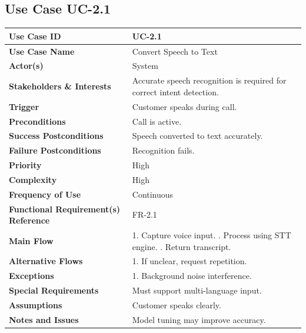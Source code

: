 \documentclass[12pt,a4paper]{report}
\begin{document}
\subsection*{Use Case UC-2.1}
\begin{longtable}{|p{4cm}|p{9cm}|}
\hline
\textbf{Use Case ID} & UC-2.1 \\ \hline
\textbf{Use Case Name} & Convert Speech to Text \\ \hline
\textbf{Actor(s)} & System \\ \hline
\textbf{Stakeholders \& Interests} & Accurate speech recognition is required for correct intent detection. \\ \hline
\textbf{Trigger} & Customer speaks during call. \\ \hline
\textbf{Preconditions} & Call is active. \\ \hline
\textbf{Success Postconditions} & Speech converted to text accurately. \\ \hline
\textbf{Failure Postconditions} & Recognition fails. \\ \hline
\textbf{Priority} & High \\ \hline
\textbf{Complexity} & High \\ \hline
\textbf{Frequency of Use} & Continuous \\ \hline
\textbf{Functional Requirement(s) Reference} & FR-2.1 \\ \hline
\textbf{Main Flow} &
1. Capture voice input. \newline
2. Process using STT engine. \newline
3. Return transcript. \\ \hline
\textbf{Alternative Flows} &
1. If unclear, request repetition. \\ \hline
\textbf{Exceptions} &
1. Background noise interference. \\ \hline
\textbf{Special Requirements} &
Must support multi-language input. \\ \hline
\textbf{Assumptions} &
Customer speaks clearly. \\ \hline
\textbf{Notes and Issues} &
Model tuning may improve accuracy. \\ \hline
\end{longtable}
\end{document}
